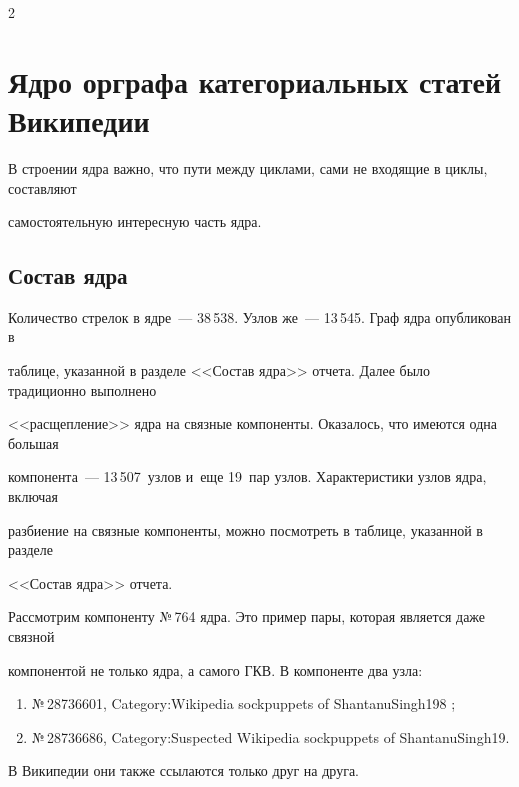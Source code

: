 \begin{multicols}{2}
   

\section{Ядро орграфа категориальных статей Википедии}

   

   В строении ядра важно, что пути между циклами, сами не входящие в циклы, составляют 

самостоятельную интересную часть ядра. 



\subsection{Состав ядра}



   Количество стрелок в ядре~--- 38\,538. Узлов же~--- 13\,545. Граф ядра опубликован в 

таблице, указанной в разделе <<Состав ядра>> отчета. Далее было традиционно выполнено 

<<расщепление>> ядра на связные компоненты. Оказалось, что имеются одна большая 

компонента~--- 13\,507~узлов и~еще 19~пар узлов. Характеристики узлов ядра, включая 

разбиение на связные компоненты, можно посмотреть в таблице, указанной в разделе 

<<Состав ядра>> отчета.

   

   Рассмотрим компоненту №\,764 ядра. Это пример пары, которая является даже связной 

компонентой не только ядра, а самого ГКВ. В компоненте два узла:

\begin{enumerate}[(1)]   

\item

№\,28736601, Category:Wikipedia sockpuppets of ShantanuSingh198 ;

\item

№\,28736686, Category:Suspected Wikipedia sockpuppets of ShantanuSingh19.

\end{enumerate}

   

      В Википедии они также ссылаются только друг на друга.

      


\end{multicols}
